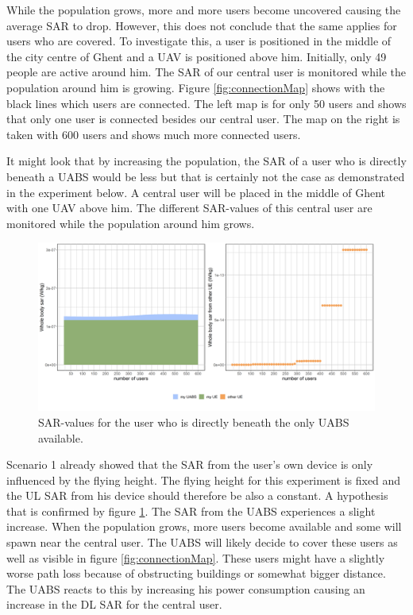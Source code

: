 While the population grows, more and more users become uncovered causing the average SAR to drop. However, this does not conclude that the same applies for 
users who are covered. To investigate this, a user is positioned in the middle of the city centre of Ghent and a \gls{UAV} is positioned above him. Initially, only 
49 people are active around him. The \gls{SAR} of our central user is monitored while the population around him is growing.
Figure \ref{fig:connectionMap} shows with the black lines which users are connected. The left map is for only 50 users and 
shows that only one user is connected besides our central user. The map on the right is taken with 600 users and shows much more connected users.



It might look that by increasing the population, the SAR of a user who is directly beneath a \gls{UABS} would be less but that is 
certainly not the case as demonstrated in the experiment below. A central user will be placed in the middle of Ghent with one \gls{UAV} above him.
The different \gls{SAR}-values of this central user are monitored while the population around him grows.

\begin{figure}[h!]
\centering
  \includegraphics[width=\textwidth/6*5]{../results/s2/uvsulsarcentralUser.png}
  \caption{SAR-values for the user who is directly beneath the only UABS available.}
  \label{fig:uvsulsarcentralUsers}
\end{figure}

Scenario 1 already showed that the \gls{SAR} from the user's own device is only influenced by the flying height. 
The flying height for this experiment is fixed and the \gls{UL} \gls{SAR} from his device should therefore be also a constant. 
A hypothesis that is confirmed by figure \ref{fig:uvsulsarcentralUsers}.
The \gls{SAR} from the \gls{UABS} experiences a slight increase. When the population grows, more users become available 
and some will spawn near the central user. The \gls{UABS} will likely decide to cover these users as well as visible in figure \ref{fig:connectionMap}.
These users might have a slightly 
worse path loss because of obstructing buildings or somewhat bigger distance. The \gls{UABS} reacts to this by increasing 
his power consumption causing an increase in the \gls{DL} \gls{SAR} for the central user.

